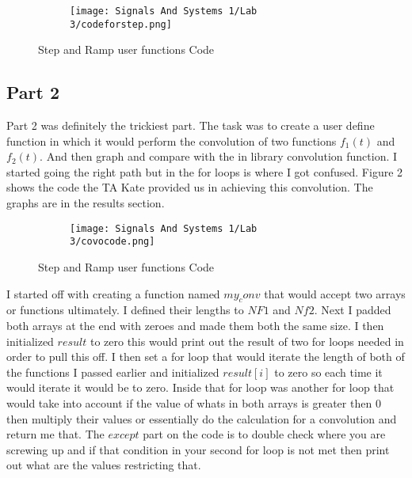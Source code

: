\documentclass[12pt,a4paper]{article}
\begin{document}
\begin{figure}[h]
\begin{subfigure}{ 1\textwidth}
\texttt{[image: Signals And Systems 1/Lab 3/codeforstep.png]}
\end{subfigure}
\caption{Step and Ramp user functions Code}
\label{fig:image2}
\end{figure}



\clearpage
\subsection{Part 2}
Part 2 was definitely the trickiest part. The task was to create a user define function in which it would perform the convolution of two functions $f_1(t)$ and $f_2(t)$. And then graph and compare with the in library convolution function.
I started going the right path but in the for loops is where I got confused. Figure 2 shows the code the TA Kate provided us in achieving this convolution. The graphs are in the results section.


\begin{figure}[h]
\begin{subfigure}{ 1\textwidth}
\texttt{[image: Signals And Systems 1/Lab 3/covocode.png]}
\end{subfigure}
\caption{Step and Ramp user functions Code}
\label{fig:image2}
\end{figure}

I started off with creating a function named $my_conv$ that would accept two arrays or functions ultimately. I defined their lengths to $NF1$ and $Nf2$. Next I padded both arrays at the end with zeroes and made them both the same size. I then initialized $result$ to zero this would print out the result of two for loops needed in order to pull this off.
\clearpage
I then set a for loop that would iterate the length of both of the functions I passed earlier and initialized $result[i] $ to zero so each time it would iterate it would be to zero. Inside that for loop was another for loop that would take into account if the value of whats in both arrays is greater then 0 then multiply their values or essentially do the calculation for a convolution and return me that. The $except$ part on the code is to double check where you are screwing up and if that  condition in your second for loop is not met then print out what are the values restricting that.
\end{document}
